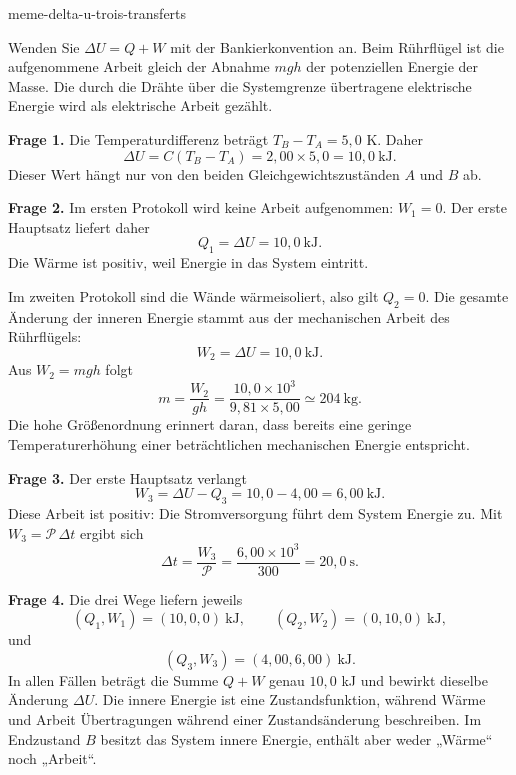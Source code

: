 \begin{exo}{meme-delta-u-trois-transferts}
\begin{indication}
Wenden Sie $\Delta U=Q+W$ mit der Bankierkonvention an. Beim Rührflügel ist
die aufgenommene Arbeit gleich der Abnahme $mgh$ der potenziellen Energie der
Masse. Die durch die Drähte über die Systemgrenze übertragene elektrische
Energie wird als elektrische Arbeit gezählt.
\end{indication}

\begin{solution}
\textbf{Frage 1.} Die Temperaturdifferenz beträgt $T_B-T_A=5{,}0$ K. Daher
\[
\Delta U=C(T_B-T_A)=2{,}00\times5{,}0=10{,}0\ \mathrm{kJ}.
\]
Dieser Wert hängt nur von den beiden Gleichgewichtszuständen $A$ und $B$ ab.

\textbf{Frage 2.} Im ersten Protokoll wird keine Arbeit aufgenommen:
$W_1=0$. Der erste Hauptsatz liefert daher
\[
Q_1=\Delta U=10{,}0\ \mathrm{kJ}.
\]
Die Wärme ist positiv, weil Energie in das System eintritt.

Im zweiten Protokoll sind die Wände wärmeisoliert, also gilt $Q_2=0$.
Die gesamte Änderung der inneren Energie stammt aus der mechanischen Arbeit
des Rührflügels:
\[
W_2=\Delta U=10{,}0\ \mathrm{kJ}.
\]
Aus $W_2=mgh$ folgt
\[
m=\frac{W_2}{gh}
=\frac{10{,}0\times10^3}{9{,}81\times5{,}00}
\simeq204\ \mathrm{kg}.
\]
Die hohe Größenordnung erinnert daran, dass bereits eine geringe
Temperaturerhöhung einer beträchtlichen mechanischen Energie entspricht.

\textbf{Frage 3.} Der erste Hauptsatz verlangt
\[
W_3=\Delta U-Q_3=10{,}0-4{,}00=6{,}00\ \mathrm{kJ}.
\]
Diese Arbeit ist positiv: Die Stromversorgung führt dem System Energie zu.
Mit $W_3=\mathcal P\,\Delta t$ ergibt sich
\[
\Delta t=\frac{W_3}{\mathcal P}
=\frac{6{,}00\times10^3}{300}=20{,}0\ \mathrm{s}.
\]

\textbf{Frage 4.} Die drei Wege liefern jeweils
\[
(Q_1,W_1)=(10{,}0,0)\ \mathrm{kJ},\qquad
(Q_2,W_2)=(0,10{,}0)\ \mathrm{kJ},
\]
und
\[
(Q_3,W_3)=(4{,}00,6{,}00)\ \mathrm{kJ}.
\]
In allen Fällen beträgt die Summe $Q+W$ genau $10{,}0$ kJ und bewirkt dieselbe
Änderung $\Delta U$. Die innere Energie ist eine Zustandsfunktion, während
Wärme und Arbeit Übertragungen während einer Zustandsänderung beschreiben.
Im Endzustand $B$ besitzt das System innere Energie, enthält aber weder
„Wärme“ noch „Arbeit“.
\end{solution}
\end{exo}

